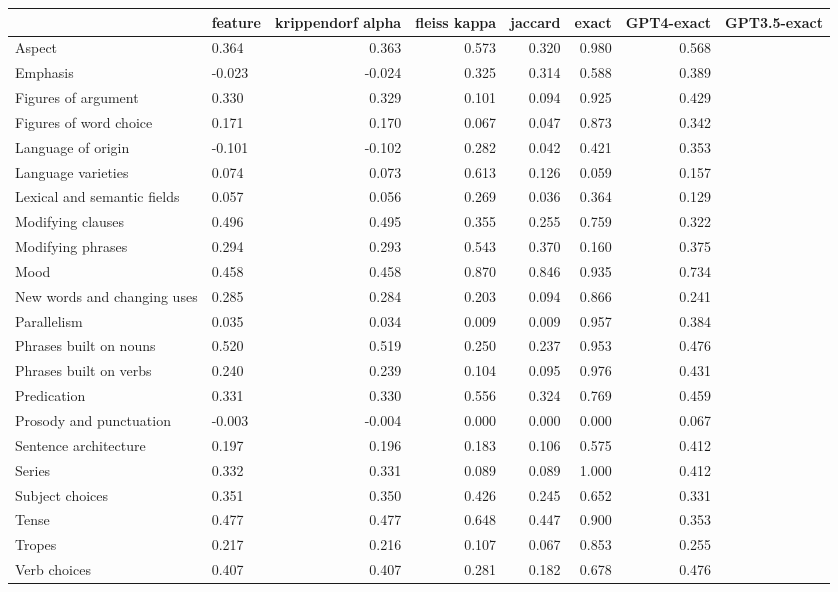 \begin{tabular}{llrrrrrr}
\toprule
{} & feature & krippendorf alpha & fleiss kappa & jaccard & exact & GPT4-exact & GPT3.5-exact \\
\midrule
Aspect & 0.364 & 0.363 & 0.573 & 0.320 & 0.980 & 0.568 \\
Emphasis & -0.023 & -0.024 & 0.325 & 0.314 & 0.588 & 0.389 \\
Figures of argument & 0.330 & 0.329 & 0.101 & 0.094 & 0.925 & 0.429 \\
Figures of word choice & 0.171 & 0.170 & 0.067 & 0.047 & 0.873 & 0.342 \\
Language of origin & -0.101 & -0.102 & 0.282 & 0.042 & 0.421 & 0.353 \\
Language varieties & 0.074 & 0.073 & 0.613 & 0.126 & 0.059 & 0.157 \\
Lexical and semantic fields & 0.057 & 0.056 & 0.269 & 0.036 & 0.364 & 0.129 \\
Modifying clauses & 0.496 & 0.495 & 0.355 & 0.255 & 0.759 & 0.322 \\
Modifying phrases & 0.294 & 0.293 & 0.543 & 0.370 & 0.160 & 0.375 \\
Mood & 0.458 & 0.458 & 0.870 & 0.846 & 0.935 & 0.734 \\
New words and changing uses & 0.285 & 0.284 & 0.203 & 0.094 & 0.866 & 0.241 \\
Parallelism & 0.035 & 0.034 & 0.009 & 0.009 & 0.957 & 0.384 \\
Phrases built on nouns & 0.520 & 0.519 & 0.250 & 0.237 & 0.953 & 0.476 \\
Phrases built on verbs & 0.240 & 0.239 & 0.104 & 0.095 & 0.976 & 0.431 \\
Predication & 0.331 & 0.330 & 0.556 & 0.324 & 0.769 & 0.459 \\
Prosody and punctuation & -0.003 & -0.004 & 0.000 & 0.000 & 0.000 & 0.067 \\
Sentence architecture & 0.197 & 0.196 & 0.183 & 0.106 & 0.575 & 0.412 \\
Series & 0.332 & 0.331 & 0.089 & 0.089 & 1.000 & 0.412 \\
Subject choices & 0.351 & 0.350 & 0.426 & 0.245 & 0.652 & 0.331 \\
Tense & 0.477 & 0.477 & 0.648 & 0.447 & 0.900 & 0.353 \\
Tropes & 0.217 & 0.216 & 0.107 & 0.067 & 0.853 & 0.255 \\
Verb choices & 0.407 & 0.407 & 0.281 & 0.182 & 0.678 & 0.476 \\
\bottomrule
\end{tabular}
